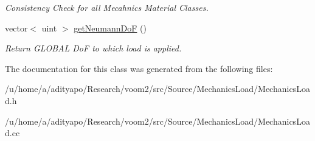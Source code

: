 \begin{DoxyCompactItemize}
\begin{DoxyCompactList}\small\item\em Consistency Check for all Mecahnics Material Classes. \item\end{DoxyCompactList}\item 
\hypertarget{classvoom_1_1_mechanics_load_ac6171ce7c8c616e8caef1906a102e656}{
vector$<$ uint $>$ \hyperlink{classvoom_1_1_mechanics_load_ac6171ce7c8c616e8caef1906a102e656}{getNeumannDoF} ()}
\label{classvoom_1_1_mechanics_load_ac6171ce7c8c616e8caef1906a102e656}

\begin{DoxyCompactList}\small\item\em Return GLOBAL DoF to which load is applied. \item\end{DoxyCompactList}\end{DoxyCompactItemize}


The documentation for this class was generated from the following files:\begin{DoxyCompactItemize}
\item 
/u/home/a/adityapo/Research/voom2/src/Source/MechanicsLoad/MechanicsLoad.h\item 
/u/home/a/adityapo/Research/voom2/src/Source/MechanicsLoad/MechanicsLoad.cc\end{DoxyCompactItemize}
